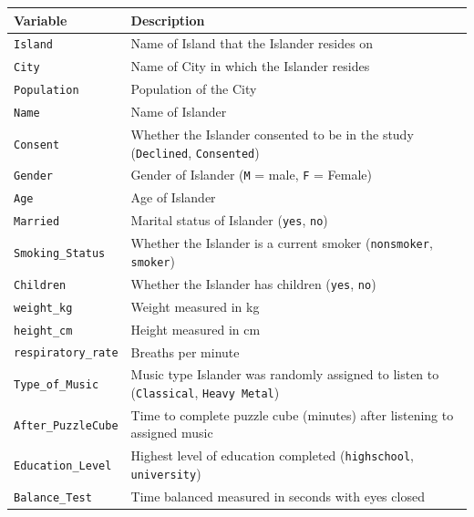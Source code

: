 \documentclass[
]{report}
\newcounter{none} %
\begin{document}
{\def\LTcaptype{none} %
\begin{longtable}[]{@{}
  >{\raggedright\arraybackslash}p{}
  >{\raggedright\arraybackslash}p{}@{}}
\toprule\noalign{}
\begin{minipage}[b]{\linewidth}\raggedright
\textbf{Variable}
\end{minipage} & \begin{minipage}[b]{\linewidth}\raggedright
\textbf{Description}
\end{minipage} \\
\midrule\noalign{}
\endhead
\bottomrule\noalign{}
\endlastfoot
\texttt{Island} & Name of Island that the Islander resides on \\
\texttt{City} & Name of City in which the Islander resides \\
\texttt{Population} & Population of the City \\
\texttt{Name} & Name of Islander \\
\texttt{Consent} & Whether the Islander consented to be in the study (\texttt{Declined}, \texttt{Consented}) \\
\texttt{Gender} & Gender of Islander (\texttt{M} = male, \texttt{F} = Female) \\
\texttt{Age} & Age of Islander \\
\texttt{Married} & Marital status of Islander (\texttt{yes}, \texttt{no}) \\
\texttt{Smoking\_Status} & Whether the Islander is a current smoker (\texttt{nonsmoker}, \texttt{smoker}) \\
\texttt{Children} & Whether the Islander has children (\texttt{yes}, \texttt{no}) \\
\texttt{weight\_kg} & Weight measured in kg \\
\texttt{height\_cm} & Height measured in cm \\
\texttt{respiratory\_rate} & Breaths per minute \\
\texttt{Type\_of\_Music} & Music type Islander was randomly assigned to listen to (\texttt{Classical}, \texttt{Heavy\ Metal}) \\
\texttt{After\_PuzzleCube} & Time to complete puzzle cube (minutes) after listening to assigned music \\
\texttt{Education\_Level} & Highest level of education completed (\texttt{highschool}, \texttt{university}) \\
\texttt{Balance\_Test} & Time balanced measured in seconds with eyes closed \\

\end{longtable}}
\end{document}
